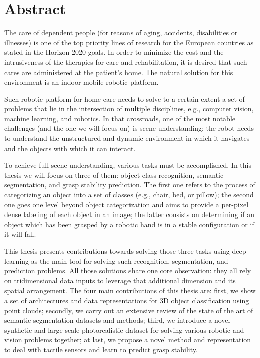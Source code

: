 \chapter{Abstract}

The care of dependent people (for reasons of aging, accidents, disabilities or illnesses) is one of the top priority lines of research for the European countries as stated in the Horizon 2020 goals. In order to minimize the cost and the intrusiveness of the therapies for care and rehabilitation, it is desired that such cares are administered at the patient's home. The natural solution for this environment is an indoor mobile robotic platform.

Such robotic platform for home care needs to solve to a certain extent a set of problems that lie in the intersection of multiple disciplines, e.g., computer vision, machine learning, and robotics. In that crossroads, one of the most notable challenges (and the one we will focus on) is scene understanding: the robot needs to understand the unstructured and dynamic environment in which it navigates and the objects with which it can interact.

To achieve full scene understanding, various tasks must be accomplished. In this thesis we will focus on three of them: object class recognition, semantic segmentation, and grasp stability prediction. The first one refers to the process of categorizing an object into a set of classes (e.g., chair, bed, or pillow); the second one goes one level beyond object categorization and aims to provide a per-pixel dense labeling of each object in an image; the latter consists on determining if an object which has been grasped by a robotic hand is in a stable configuration or if it will fall.

This thesis presents contributions towards solving those three tasks using deep learning as the main tool for solving such recognition, segmentation, and prediction problems. All those solutions share one core observation: they all rely on tridimensional data inputs to leverage that additional dimension and its spatial arrangement. The four main contributions of this thesis are: first, we show a set of architectures and data representations for 3D object classification using point clouds; secondly, we carry out an extensive review of the state of the art of semantic segmentation datasets and methods; third, we introduce a novel synthetic and large-scale photorealistic dataset for solving various robotic and vision problems together; at last, we propose a novel method and representation to deal with tactile sensors and learn to predict grasp stability.  